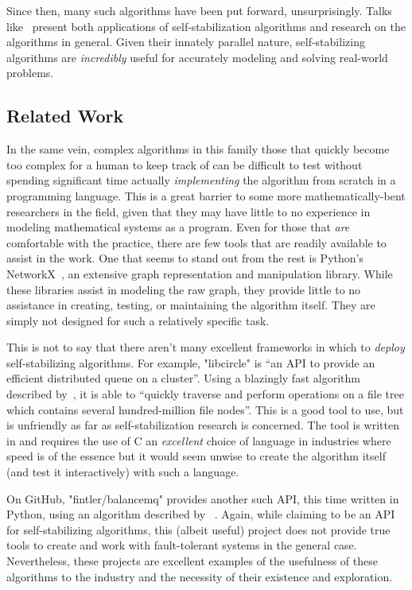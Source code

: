Since then, many such algorithms have been put forward, unsurprisingly.
Talks like~\autocite{dolev:talk} present both
  applications of self-stabilization algorithms and
  research on the algorithms in general.
Given their innately parallel nature,
  self-stabilizing algorithms are \emph{incredibly} useful
  for accurately modeling and solving real-world problems.

\subsection{Related Work}
\label{sec:introduction:related-work}
In the same vein, complex algorithms in this family
  \Dash those that quickly become too complex for a human to keep track of \Dash
  can be difficult to test without spending significant time
  actually \emph{implementing} the algorithm from scratch in a programming language.
This is a great barrier to some more mathematically-bent researchers in the field,
  given that they may have little to no experience in modeling mathematical systems as a program.
Even for those that \emph{are} comfortable with the practice,
  there are few tools that are readily available to assist in the work.
One that seems to stand out from the rest is Python's NetworkX~\autocite{hagberg:networkx},
  an extensive graph representation and manipulation library.
While these libraries assist in modeling the raw graph,
  they provide little to no assistance in creating, testing, or maintaining the algorithm itself.
They are simply not designed for such a relatively specific task.

This is not to say that there aren't many excellent frameworks in which
  to \emph{deploy} self-stabilizing algorithms.
For example, "libcircle" is \enquote{an API to provide an efficient distributed queue on a cluster}.
Using a blazingly fast algorithm described by~\autocite{lafon:libcircle},
  it is able to \enquote{quickly traverse and perform operations on a file tree
    which contains several hundred-million file nodes}.
This is a good tool to use, but is unfriendly as far as self-stabilization research is concerned.
The tool is written in and requires the use of C
  \Dash an \emph{excellent} choice of language in industries where speed is of the essence \Dash
  but it would seem unwise to create the algorithm itself
  (and test it interactively) with such a language.

On GitHub, "fintler/balancemq" provides another such API, this time written in Python,
  using an algorithm described by \citeauthor{lafon:balanceMQ}~\autocite{lafon:balanceMQ}.
Again, while claiming to be an API for self-stabilizing algorithms,
  this (albeit useful) project does not provide true tools to create and work with
  fault-tolerant systems in the general case.
Nevertheless, these projects are excellent examples of the
  usefulness of these algorithms to the industry and
  the necessity of their existence and exploration.

